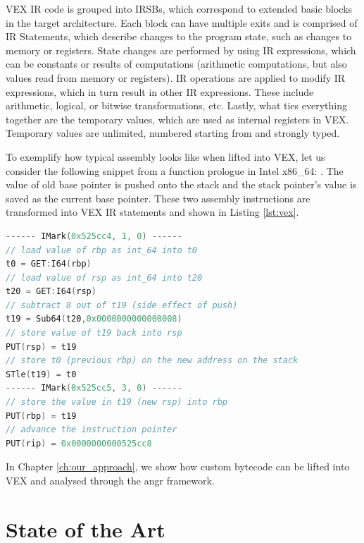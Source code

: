 VEX \gls{IR} code is grouped into \glspl{IRSB}, which correspond to extended basic blocks in the target architecture. Each block can have multiple exits and is comprised of \gls{IR} Statements, which describe changes to the program state, such as changes to memory or registers. State changes are performed by using \gls{IR} expressions, which can be constants or results of computations (arithmetic computations, but also values read from memory or registers). \gls{IR} operations are applied to modify \gls{IR} expressions, which in turn result in other \gls{IR} expressions. These include arithmetic, logical, or bitwise transformations, etc. Lastly, what ties everything together are the temporary values, which are used as internal registers in VEX. Temporary values are unlimited, numbered starting from  and strongly typed. \cite{angr_ir} \cite{vex_ir}

To exemplify how typical assembly looks like when lifted into VEX, let us consider the following snippet from a function prologue in Intel x86\_64: . The value of old base pointer is pushed onto the stack and the stack pointer's value is saved as the current base pointer. These two assembly instructions are transformed into VEX \gls{IR} statements and shown in Listing \ref{lst:vex}.

\begin{lstlisting}[language={c}, label={lst:vex}, caption={VEX \gls{IR} corresponding to the \cc{push rbp; mov rbp, rsp} instruction sequence in Intel x86\_64. Each machine instruction is split into muliple, transparent, VEX statements. Each original machine instruction is delimited by an IMark, which specifies the address of the original instruction, and its length in bytes.}]
------ IMark(0x525cc4, 1, 0) ------
// load value of rbp as int_64 into t0
t0 = GET:I64(rbp)
// load value of rsp as int_64 into t20
t20 = GET:I64(rsp)
// subtract 8 out of t19 (side effect of push)
t19 = Sub64(t20,0x0000000000000008)
// store value of t19 back into rsp
PUT(rsp) = t19
// store t0 (previous rbp) on the new address on the stack
STle(t19) = t0
------ IMark(0x525cc5, 3, 0) ------
// store the value in t19 (new rsp) into rbp
PUT(rbp) = t19
// advance the instruction pointer
PUT(rip) = 0x0000000000525cc8
\end{lstlisting}

In Chapter \ref{ch:our_approach}, we show how custom bytecode can be lifted into VEX and analysed through the angr framework.

\chapter{State of the Art}

